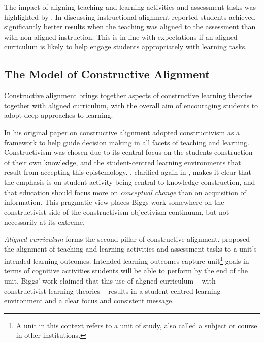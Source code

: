 The impact of aligning teaching and learning activities and assessment tasks was highlighted by \citet{Cohen:1987}. In discussing instructional alignment \citet{Cohen:1987} reported students achieved significantly better results when the teaching was aligned to the assessment than with non-aligned instruction. This is in line with expectations if an aligned curriculum is likely to help engage students appropriately with learning tasks.


\subsection{The Model of Constructive Alignment} %
\label{sub:the_model_of_constructive_alignment}

Constructive alignment brings together aspects of constructive learning theories together with aligned curriculum, with the overall aim of encouraging students to adopt deep approaches to learning.

In his original paper on constructive alignment \citet{Biggs:1996c} adopted constructivism as a framework to help guide decision making in all facets of teaching and learning. Constructivism was chosen due to its central focus on the students construction of their own knowledge, and the student-centred learning environments that result from accepting this epistemology. \citet{Biggs:1996c}, clarified again in \citet{Biggs:2007}, makes it clear that the emphasis is on student activity being central to knowledge construction, and that education should focus more on \emph{conceptual change} than on acquisition of information. This pragmatic view places Biggs work somewhere on the constructivist side of the constructivism-objectivism continuum, but not necessarily at its extreme. 

\emph{Aligned curriculum} forms the second pillar of constructive alignment. \citet{Biggs:1996c} proposed the alignment of teaching and learning activities and assessment tasks to a unit's intended learning outcomes. Intended learning outcomes capture unit\footnote{A unit in this context refers to a unit of study, also called a subject or course in other institutions.} goals in terms of cognitive activities students will be able to perform by the end of the unit. Biggs' work claimed that this use of aligned curriculum -- with constructivist learning theories -- results in a student-centred learning environment and a clear focus and consistent message.

